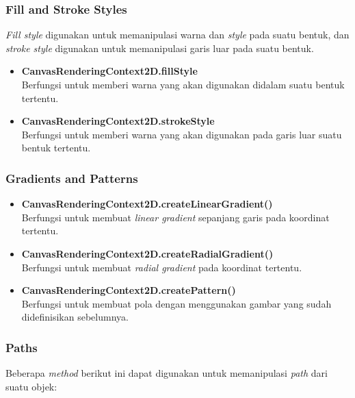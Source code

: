 \subsubsection{Fill and Stroke Styles}
\textit{Fill style} digunakan untuk memanipulasi warna dan \textit{style} pada suatu bentuk, dan \textit{stroke style} digunakan untuk memanipulasi garis luar pada suatu bentuk.

\begin{itemize}
	\item \textbf{CanvasRenderingContext2D.fillStyle} \\ Berfungsi untuk memberi warna yang akan digunakan didalam suatu bentuk tertentu.
	\item \textbf{CanvasRenderingContext2D.strokeStyle} \\ Berfungsi untuk memberi warna yang akan digunakan pada garis luar suatu bentuk tertentu.
\end{itemize}

\subsubsection{Gradients and Patterns}

\begin{itemize}
	\item \textbf{CanvasRenderingContext2D.createLinearGradient()} \\ Berfungsi untuk membuat \textit{linear gradient} sepanjang garis pada koordinat tertentu.
	\item \textbf{CanvasRenderingContext2D.createRadialGradient()} \\ Berfungsi untuk membuat \textit{radial gradient} pada koordinat tertentu.
	\item \textbf{CanvasRenderingContext2D.createPattern()} \\ Berfungsi untuk membuat pola dengan menggunakan gambar yang sudah didefinisikan sebelumnya.
\end{itemize}

\subsubsection{Paths}
Beberapa \textit{method} berikut ini dapat digunakan untuk memanipulasi \textit{path} dari suatu objek:

